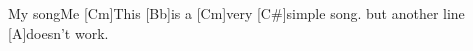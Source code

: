 \begin{song}{My song}{Me}
[Cm]This [Bb]is a [Cm]very [C#]simple song.
but another line [A]doesn't work.
\end{song}
